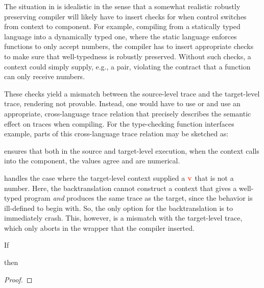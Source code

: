 \documentclass[a4paper,12pt]{article}
\begin{document}
The situation in  is idealistic in the sense that a somewhat realistic robustly preserving compiler will likely have to insert checks for when control switches from context to component.
For example, compiling from a statically typed language into a dynamically typed one, where the static language enforces functions to only accept numbers, the compiler has to insert appropriate checks to make sure that well-typedness is robustly preserved.
Without such checks, a context could simply supply, e.g., a pair, violating the contract that a function can only receive numbers.

These checks yield a mismatch between the source-level trace and the target-level trace, rendering  not provable.
Instead, one would have to use  or  and use an appropriate, cross-language trace relation that precisely describes the semantic effect on traces when compiling.
For the type-checking function interfaces example, parts of this cross-language trace relation may be sketched as:

\begin{center}
\end{center}
 ensures that both in the source and target-level execution, when the context calls into the component, the values agree and are numerical.

 handles the case where the target-level context supplied a $\trg{v}$ that is not a number.
Here, the backtranslation cannot construct a context that gives a well-typed program {\em and} produces the same trace as the target, since the behavior is ill-defined to begin with.
So, the only option for the backtranslation is to immediately crash.
This, however, is a mismatch with the target-level trace, which only aborts in the wrapper that the compiler inserted.

\begin{lemma}[\Coqed]{}
  If 
  \begin{assumptions}
  \end{assumptions}
  then
  \begin{goals}
  \end{goals}
\end{lemma}
\begin{proof}
  \incompleteProof
\end{proof}
\end{document}
